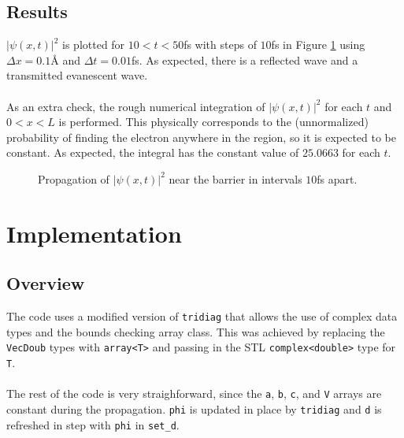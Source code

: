 \documentclass[12pt]{article}
\newcommand{\dx}{\Delta x}
\newcommand{\dt}{\Delta t}
\begin{document}
\subsection{Results}
$|\psi(x, t)|^2$ is plotted for $10 < t < 50$fs with steps of $10$fs in Figure \ref{f3} using $\dx = 0.1\text{\AA}$ and $\dt = 0.01$fs. As expected, there is a reflected wave and a transmitted evanescent wave.\\\\
As an extra check, the rough numerical integration of $|\psi(x, t)|^2$ for each $t$ and $0 < x < L$ is performed. This physically corresponds to the (unnormalized) probability of finding the electron anywhere in the region, so it is expected to be constant. As expected, the integral has the constant value of $25.0663$ for each $t$.
\begin{figure}
 \qquad
{} \qquad
{} \qquad
{} \qquad
{} \qquad
\caption{Propagation of $|\psi(x, t)|^2$ near the barrier in intervals $10$fs apart.}
  \label{f3}
\end{figure}
\clearpage
\section{Implementation}
\subsection{Overview}
The code uses a modified version of \texttt{tridiag} that allows the use of complex data types and the bounds checking array class. This was achieved by replacing the \texttt{VecDoub} types with \texttt{array<T>} and passing in the STL \texttt{complex<double>} type for \texttt{T}. \\ \\
The rest of the code is very straighforward, since the \texttt{a}, \texttt{b}, \texttt{c}, and \texttt{V} arrays are constant during the propagation. \texttt{phi} is updated in place by \texttt{tridiag} and \texttt{d} is refreshed in step with \texttt{phi} in \texttt{set\_d}.
\end{document}
